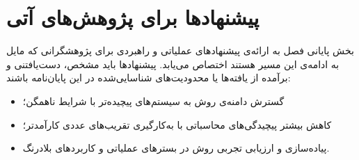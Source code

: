 \section{پیشنهادها برای پژوهش‌های آتی}\label{sec:6-3}

بخش پایانی فصل به ارائه‌ی پیشنهادهای عملیاتی و راهبردی برای پژوهشگرانی که مایل به ادامه‌ی این مسیر هستند اختصاص می‌یابد. پیشنهادها باید مشخص، دست‌یافتنی و برآمده از یافته‌ها یا محدودیت‌های شناسایی‌شده در این پایان‌نامه باشند:
\begin{itemize}
    \item گسترش دامنه‌ی روش به سیستم‌های پیچیده‌تر با شرایط ناهمگن؛
    \vspace{-0.25cm}
    \item کاهش بیشتر پیچیدگی‌های محاسباتی با به‌کارگیری تقریب‌های عددی کارآمدتر؛
    \vspace{-0.25cm}
    \item پیاده‌سازی و ارزیابی تجربی روش در بسترهای عملیاتی و کاربردهای بلادرنگ.
\end{itemize}
